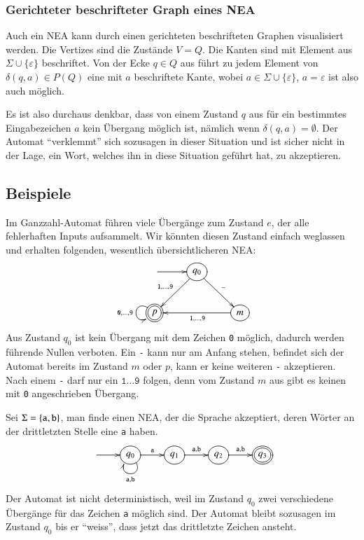 \subsubsection{Gerichteter beschrifteter Graph eines NEA}
%
Auch ein NEA kann durch einen gerichteten beschrifteten Graphen
visualisiert werden.
Die Vertizes sind die Zustände $V=Q$.
Die Kanten sind mit Element aus $\Sigma\cup\{\varepsilon\}$ beschriftet.
Von der Ecke $q\in Q$ aus führt zu jedem Element von $\delta(q,a)\in P(Q)$
eine mit $a$ beschriftete Kante, wobei $a\in \Sigma\cup\{\varepsilon\}$, $a=\varepsilon$ ist also auch möglich.

Es ist also durchaus denkbar, dass von einem Zustand $q$ aus für ein
bestimmtes Eingabezeichen $a$ kein Übergang möglich ist, nämlich
wenn $\delta(q,a)=\emptyset$.
Der Automat ``verklemmt'' sich sozusagen in dieser Situation und ist
sicher nicht in der Lage, ein Wort, welches
ihn in diese Situation geführt hat, zu akzeptieren.


\subsection{Beispiele}
\begin{beispiel}
Im Ganzzahl-Automat führen viele Übergänge zum Zustand $e$, der
alle fehlerhaften Inputs aufsammelt.
Wir könnten diesen Zustand einfach
weglassen und erhalten folgenden, wesentlich übersichtlicheren NEA:
\[
\entrymodifiers={++[o][F]}
\xymatrix{
*+\txt{}\ar[r]
	&{q_0}  \ar[dl]_{{\tt 1},\dots,{\tt 9}} \ar[dr]^{\tt -}
\\
*++[o][F=]{p}\ar@(ul,dl)_{{\tt 0},\dots,{\tt 9}}
	&*+\txt{}
		&{m} \ar[ll]^{{\tt 1},\dots,{\tt 9}}
}
\]
Aus Zustand $q_0$ ist kein Übergang mit dem Zeichen {\tt 0} möglich,
dadurch werden führende Nullen verboten.
Ein {\tt -} kann nur am Anfang
stehen, befindet sich der Automat bereits im Zustand $m$ oder $p$, kann 
er keine weiteren {\tt -} akzeptieren.
Nach einem {\tt -} darf nur ein $\texttt{1}\dots\texttt{9}$ folgen,
denn vom Zustand $m$
aus gibt es keinen mit \texttt{0} angeschrieben Übergang.
\end{beispiel}

\begin{beispiel}
Sei $\Sigma=\{{\tt a},{\tt b}\}$, man finde einen NEA, der die 
Sprache akzeptiert, deren Wörter an der drittletzten Stelle
eine {\tt a} haben.
\[
\entrymodifiers={++[o][F]}
\xymatrix{
*+\txt{} \ar[r]
	&{q_0} \ar[r]^{\tt a} \ar@(dr,dl)^{{\tt a},{\tt b}}
		&{q_1}\ar[r]^{{\tt a},{\tt b}}
			&{q_2}\ar[r]^{{\tt a},{\tt b}}
				&*++[o][F=]{q_3}
}
\]
Der Automat ist nicht deterministisch, weil im Zustand $q_0$ zwei verschiedene
Übergänge für das Zeichen {\tt a} möglich sind.
Der Automat bleibt
sozusagen im Zustand $q_0$ bis er ``weiss'', dass jetzt das drittletzte
Zeichen ansteht.
\end{beispiel}

